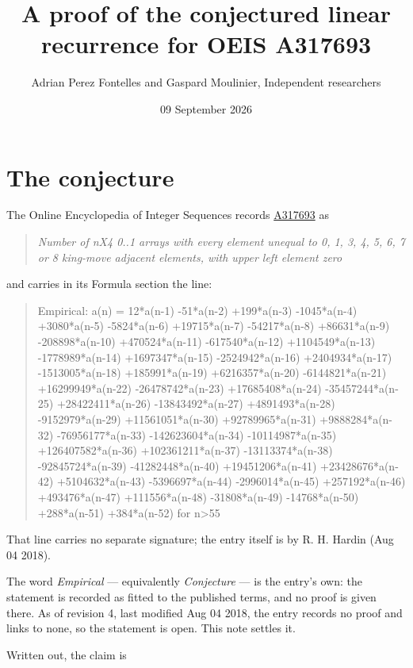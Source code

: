 \documentclass[11pt]{article}
\title{A proof of the conjectured linear recurrence for OEIS A317693}
\author{Adrian Perez Fontelles and Gaspard Moulinier, Independent researchers}
\date{09 September 2026}
\theoremstyle{definition}
\begin{document}
\maketitle
\section{The conjecture}

The Online Encyclopedia of Integer Sequences records \href{https://oeis.org/A317693}{A317693} as

\begin{quote}\itshape Number of nX4 0..1 arrays with every element unequal to 0, 1, 3, 4, 5, 6, 7 or 8 king-move adjacent elements, with upper left element zero\end{quote}

and carries in its Formula section the line:

\begin{quote}\ttfamily Empirical: a(n) = 12*a(n-1) -51*a(n-2) +199*a(n-3) -1045*a(n-4) +3080*a(n-5) -5824*a(n-6) +19715*a(n-7) -54217*a(n-8) +86631*a(n-9) -208898*a(n-10) +470524*a(n-11) -617540*a(n-12) +1104549*a(n-13) -1778989*a(n-14) +1697347*a(n-15) -2524942*a(n-16) +2404934*a(n-17) -1513005*a(n-18) +185991*a(n-19) +6216357*a(n-20) -6144821*a(n-21) +16299949*a(n-22) -26478742*a(n-23) +17685408*a(n-24) -35457244*a(n-25) +28422411*a(n-26) -13843492*a(n-27) +4891493*a(n-28) -9152979*a(n-29) +11561051*a(n-30) +92789965*a(n-31) +9888284*a(n-32) -76956177*a(n-33) -142623604*a(n-34) -10114987*a(n-35) +126407582*a(n-36) +102361211*a(n-37) -13113374*a(n-38) -92845724*a(n-39) -41282448*a(n-40) +19451206*a(n-41) +23428676*a(n-42) +5104632*a(n-43) -5396697*a(n-44) -2996014*a(n-45) +257192*a(n-46) +493476*a(n-47) +111556*a(n-48) -31808*a(n-49) -14768*a(n-50) +288*a(n-51) +384*a(n-52) for n>55\end{quote}

That line carries no separate signature; the entry itself is by R. H. Hardin (Aug 04 2018).

The word {\itshape Empirical} --- equivalently {\itshape Conjecture} --- is the entry's own: the statement is recorded as fitted to the published terms, and no proof is given there. As of revision 4, last modified Aug 04 2018, the entry records no proof and links to none, so the statement is open. This note settles it.

Written out, the claim is
\end{document}
